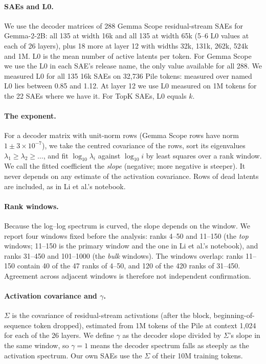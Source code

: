 \documentclass[10pt,twocolumn]{article}
\newcommand{\gam}{\gamma}
\begin{document}
\paragraph{SAEs and L0.} We use the decoder matrices of 288 Gemma Scope residual-stream SAEs for Gemma-2-2B: all 135 at width 16k and all 135 at width 65k (5--6 L0 values at each of 26 layers), plus 18 more at layer 12 with widths 32k, 131k, 262k, 524k and 1M. L0 is the mean number of active latents per token. For Gemma Scope we use the L0 in each SAE's release name, the only value available for all 288. We measured L0 for all 135 16k SAEs on 32,736 Pile tokens: measured over named L0 lies between 0.85 and 1.12. At layer 12 we use L0 measured on 1M tokens for the 22 SAEs where we have it. For TopK SAEs, L0 equals $k$.

\paragraph{The exponent.} For a decoder matrix with unit-norm rows (Gemma Scope rows have norm $1 \pm 3\times10^{-7}$), we take the centred covariance of the rows, sort its eigenvalues $\lambda_1 \ge \lambda_2 \ge \dots$, and fit $\log_{10}\lambda_i$ against $\log_{10} i$ by least squares over a rank window. We call the fitted coefficient the \emph{slope} (negative; more negative is steeper). It never depends on any estimate of the activation covariance. Rows of dead latents are included, as in Li et al.'s notebook.

\paragraph{Rank windows.} Because the log--log spectrum is curved, the slope depends on the window. We report four windows fixed before the analysis: ranks 4--50 and 11--150 (the \emph{top} windows; 11--150 is the primary window and the one in Li et al.'s notebook), and ranks 31--450 and 101--1000 (the \emph{bulk} windows). The windows overlap: ranks 11--150 contain 40 of the 47 ranks of 4--50, and 120 of the 420 ranks of 31--450. Agreement across adjacent windows is therefore not independent confirmation.

\paragraph{Activation covariance and $\gam$.} $\Sigma$ is the covariance of residual-stream activations (after the block, beginning-of-sequence token dropped), estimated from 1M tokens of the Pile at context 1,024 for each of the 26 layers. We define $\gam$ as the decoder slope divided by $\Sigma$'s slope in the same window, so $\gam = 1$ means the decoder spectrum falls as steeply as the activation spectrum. Our own SAEs use the $\Sigma$ of their 10M training tokens.
\end{document}
